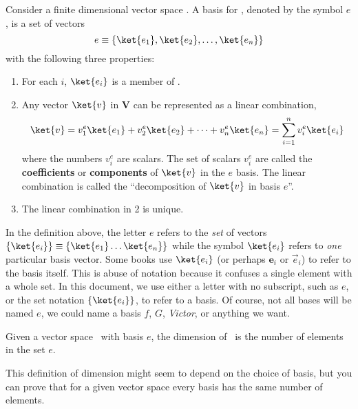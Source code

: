 \begin{definition}[Basis]
Consider a finite dimensional vector space \VS.
A basis for \VS, denoted by the symbol $e$, is a set of vectors
\begin{displaymath}
  e \equiv \{\ket{e_1}, \ket{e_2}, \ldots, \ket{e_n}\}
\end{displaymath}
with the following three properties:
\begin{enumerate}
  \item
    For each $i$, $\ket{e_i}$ is a member of \VS.
  \item
    Any vector $\ket{v}$ in \textbf{V} can be represented as a linear combination,
    \begin{displaymath}
      \ket{v}
      = v^e_1 \ket{e_1} + v^e_2 \ket{e_2} + \cdots + v^e_n \ket{e_n} = \sum_{i=1}^n v^e_i \ket{e_i}
    \end{displaymath}
    where the numbers $v_i^e$ are scalars.
    The set of scalars $v_i^e$ are called the \textbf{coefficients} or \textbf{components} of $\ket{v}$ in the $e$ basis.
    The linear combination is called the ``decomposition of $\ket{v}$ in basis $e$''.
  \item
    The linear combination in 2 is unique.
\end{enumerate}
\end{definition}
In the definition above, the letter $e$ refers to the \textit{set} of vectors $\{\ket{e_i}\} \equiv \{ \ket{e_1} \ldots \ket{e_n} \}$ while the symbol $\ket{e_i}$ refers to \emph{one} particular basis vector.
Some books use $\ket{e_i}$ (or perhaps $\mathbf{e}_i$ or $\vec{e}_i$) to refer to the basis itself.
This is abuse of notation because it confuses a single element with a whole set.
In this document, we use either a letter with no subscript, such as $e$, or the set notation $\{\ket{e_i}\}$, to refer to a basis.
Of course, not all bases will be named $e$, we could name a basis $f$, $G$, \textit{Victor}, or anything we want.

\begin{definition}[Dimension]
  Given a vector space \VS\, with basis $e$, the dimension of \VS\, is the number of elements in the set $e$.
\end{definition}
This definition of dimension might seem to depend on the choice of basis, but you can prove that for a given vector space every basis has the same number of elements.


